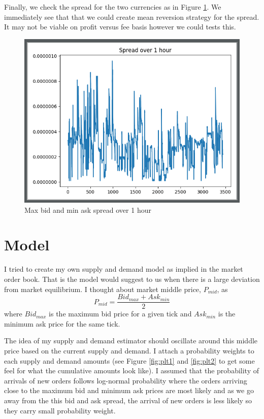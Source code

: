 \documentclass[12pt]{article}
\begin{document}
Finally, we check the spread for the two currencies as in Figure \ref{fig:plt4}. We immediately see that that we could create mean reversion strategy for the spread. It may not be viable on profit versus fee basis however we could tests this.

\begin{figure}[h!]
	\centering
  \includegraphics[scale=0.5]{plot4.png}
  \caption{Max bid and min ask spread over 1 hour}
  \label{fig:plt4}
\end{figure}

\section*{Model}
I tried to create my own supply and demand  model as implied in the market order book. That is the model would suggest to us when there is a large deviation from market equilibrium. I thought about market middle price, $P_{mid}$, as
\[
	P_{mid} = \frac{Bid_{max} + Ask_{min}}{2}
\]
where $Bid_{max}$ is the maximum bid price for a given tick and $Ask_{min}$ is the minimum ask price for the same tick.

The idea of my supply and demand estimator should oscillate around this middle price based on the current supply and demand. I attach a probability weights to each supply and demand amounts (see Figure \ref{fig:plt1} and \ref{fig:plt2} to get some feel for what the cumulative amounts look like). I assumed that the probability of arrivals of new orders follows log-normal probability where the orders arriving close to the maximum bid and minimum ask prices are most likely and as we go away from the this bid and ask spread, the arrival of new orders is less likely so they carry small probability weight.
\end{document}
